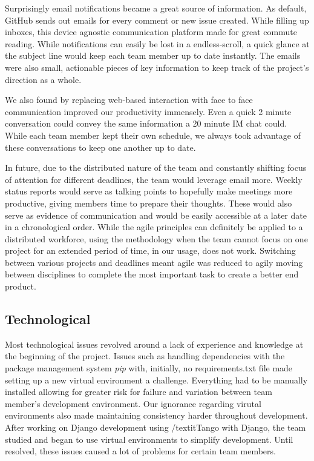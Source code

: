 \documentclass{l3proj}
\begin{document}
Surprisingly email notifications became a great source of information. As
default, GitHub sends out emails for every comment or new issue created. While
filling up inboxes, this device agnostic communication platform made for great
commute reading. While notifications can easily be lost in a endless-scroll, a quick glance at the subject line would keep each team member up to date instantly. The
emails were also small, actionable pieces of key information to keep track of the
project's direction as a whole.

We also found by replacing web-based interaction with face to face communication improved our productivity immensely. Even a quick 2 minute conversation could convey the same information a 20 minute IM chat could. While each team member kept their own schedule, we always took advantage of these conversations to keep one another up to date.

In future, due to the distributed nature of the team and constantly shifting
focus of attention for different deadlines, the team would leverage email more.
Weekly status reports would serve as talking points to hopefully make meetings
more productive, giving members time to prepare their thoughts. These would also
serve as evidence of communication and would be easily accessible at a later
date in a chronological order. While the agile principles can definitely be applied to a distributed workforce, using the methodology when the team cannot focus on one project for an extended period of time, in our usage, does not work. Switching between various projects and deadlines meant agile was reduced to agily moving between disciplines to complete the most important task to create a better end product.

\subsection{Technological}
Most technological issues revolved around a lack of experience and knowledge at
the beginning of the project. Issues such as handling dependencies with the package management system \textit{pip} with, initially, no requirements.txt file made setting up a new virtual environment a challenge. Everything had to be manually installed allowing for greater risk for failure and variation between team member's development environment. Our ignorance regarding virutal environments also made maintaining consistency harder throughout development. After working on Django development using /textit{Tango with Django}, the team studied and began to use virtual environments to simplify development. Until resolved, these issues caused a lot of problems for certain team members.
\end{document}
